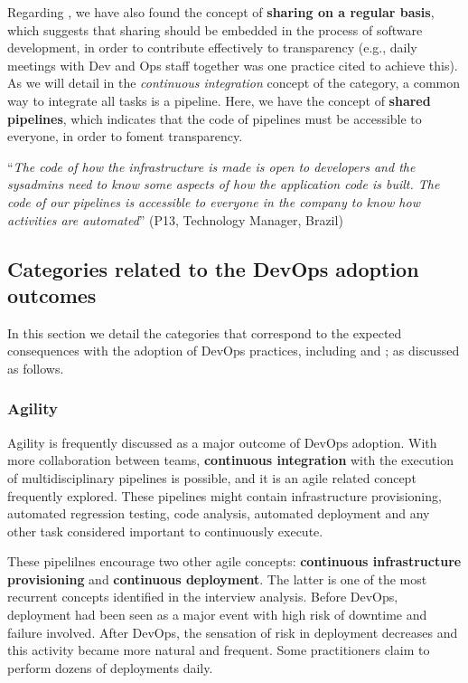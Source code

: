 Regarding , we have also found the concept of
\textbf{sharing on a regular basis}, which suggests that sharing should be
embedded in the process of software development, in order to contribute
effectively to transparency (e.g., daily meetings with Dev and Ops staff
together was one practice cited to achieve this).
As we will detail in the \emph{continuous integration} concept of
the  category, a common way to integrate all tasks is a pipeline.
Here, we have the
concept of \textbf{shared pipelines}, which indicates that the code of pipelines
must be accessible to everyone, in order to foment transparency.

\begin{mq}
``\emph{The code of how the infrastructure is
made is open to developers and the sysadmins need to know some aspects of how
the application code is built. The code of our pipelines is accessible to
everyone in the company to know how activities are automated}'' (P13, Technology
Manager, Brazil)
\end{mq}


\subsection{Categories related to the DevOps adoption outcomes}

In this section we detail the categories that correspond to
the expected consequences with the adoption of
DevOps practices, including  and ;
as discussed as follows.

\subsubsection{Agility}

Agility is frequently discussed as a major outcome of DevOps adoption. With more
collaboration between teams, \textbf{continuous integration} with the execution of
multidisciplinary pipelines is possible, and it is an agile related concept
frequently explored. These pipelines might contain
infrastructure provisioning, automated regression testing, code analysis,
automated deployment and any other task considered important
to continuously execute.

These pipelilnes encourage two other agile concepts: \textbf{continuous
infrastructure provisioning} and \textbf{continuous deployment}. The latter is
one of the most recurrent concepts identified in the interview analysis. Before
DevOps, deployment had been seen as a major event with high risk of downtime and
failure involved. After DevOps, the sensation of risk in deployment decreases
and this activity became more natural and frequent. Some practitioners claim
to perform dozens of deployments daily.

